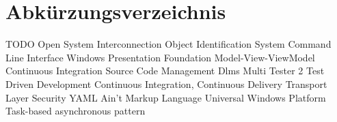 \renewcommand{\chaptermark}[1]{\markboth{\spacedlowsmallcaps{#1}}{\spacedlowsmallcaps{#1}}}
\renewcommand{\sectionmark}[1]{\markright{\thesection\enspace\spacedlowsmallcaps{#1}}}
\chapter*{Abk\"{u}rzungsverzeichnis}

\begin{acronym}[UML]
   {TODO}
   {Open System Interconnection}
   {Object Identification System}
   {Command Line Interface}
   {Windows Presentation Foundation}
   {Model-View-ViewModel}
   {Continuous Integration}
   {Source Code Management}
   {Dlms Multi Tester 2}
   {Test Driven Development}
   {Continuous Integration, Continuous Delivery}
   {Transport Layer Security}
   {YAML Ain't Markup Language}
   {Universal Windows Platform}
   {Task-based asynchronous pattern}

\end{acronym}

\cleardoublepage
